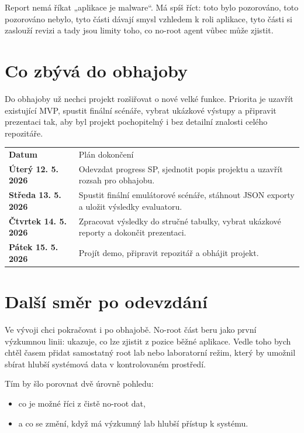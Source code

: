 \documentclass[11pt,a4paper]{article}
\begin{document}
Report nemá říkat „aplikace je malware“. Má spíš říct: toto bylo pozorováno, toto pozorováno nebylo, tyto části dávají smysl vzhledem k roli aplikace, tyto části si zaslouží revizi a tady jsou limity toho, co no-root agent vůbec může zjistit.

\section{Co zbývá do obhajoby}

Do obhajoby už nechci projekt rozšiřovat o nové velké funkce. Priorita je uzavřít existující MVP, spustit finální scénáře, vybrat ukázkové výstupy a připravit prezentaci tak, aby byl projekt pochopitelný i bez detailní znalosti celého repozitáře.

\begin{tabularx}{\textwidth}{>{\bfseries}p{34mm}X}
\rowcolor{AuraSoft}
Datum & Plán dokončení \\
Úterý 12. 5. 2026 & Odevzdat progress SP, sjednotit popis projektu a uzavřít rozsah pro obhajobu. \\
Středa 13. 5. 2026 & Spustit finální emulátorové scénáře, stáhnout JSON exporty a uložit výsledky evaluatoru. \\
Čtvrtek 14. 5. 2026 & Zpracovat výsledky do stručné tabulky, vybrat ukázkové reporty a dokončit prezentaci. \\
Pátek 15. 5. 2026 & Projít demo, připravit repozitář a obhájit projekt. \\
\end{tabularx}

\section{Další směr po odevzdání}

Ve vývoji chci pokračovat i po obhajobě. No-root část beru jako první výzkumnou linii: ukazuje, co lze zjistit z pozice běžné aplikace. Vedle toho bych chtěl časem přidat samostatný root lab nebo laboratorní režim, který by umožnil sbírat hlubší systémová data v kontrolovaném prostředí.

Tím by šlo porovnat dvě úrovně pohledu:

\begin{itemize}
  \item co je možné říci z čistě no-root dat,
  \item a co se změní, když má výzkumný lab hlubší přístup k systému.
\end{itemize}
\end{document}
